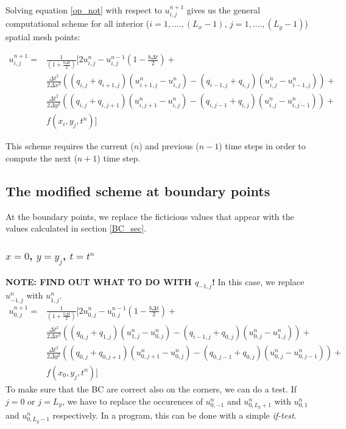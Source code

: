 \documentclass[11pt]{article} %
\newcommand{\Dx}{\Delta x}
\newcommand{\Dy}{\Delta y}
\newcommand{\Dt}{\Delta t}
\newcommand{\unp}{u^{n+1}}
\newcommand{\un}{u^{n}}
\newcommand{\unm}{u^{n-1}}
\begin{document}
Solving equation \eqref{op_not} with respect to $\unp_{i,j}$ gives us the general computational scheme for all interior ($i = 1, ....,(L_x-1)$, $j = 1,....,(L_y-1)$) spatial mesh points:

\begin{align}
\unp_{i,j} = &\frac{1}{\left(1+\frac{b\Dt}{2}\right)}\bigg[ 2\un_{i,j} - \unm_{i,j}\left(1-\frac{b\Dt}{2}\right) +\nonumber\\
&\frac{\Dt^2}{2\Dx^2}\left((q_{i,j} + q_{i+1,j})(\un_{i+1,j}-\un_{i,j}) - (q_{i-1,j} + q_{i,j})(\un_{i,j}-\un_{i-1,j})\right) + \nonumber\\
&\frac{\Dt^2}{2\Dy^2}\left((q_{i,j} + q_{i,j+1})(\un_{i,j+1}-\un_{i,j}) - (q_{i,j-1} + q_{i,j})(\un_{i,j}-\un_{i,j-1})\right) +\nonumber\\
&f(x_i, y_j, t^n)\bigg]
\end{align}


This scheme requires the current ($n$) and previous ($n-1$) time steps in order to compute the next ($n+1$) time step. 

\subsection{The modified scheme at boundary points}
At the boundary points, we replace the ficticious values that appear with the values calculated in section \ref{BC_sec}.
\subsubsection{$x=0$, $y=y_j$, $t = t^n$}
\textbf{NOTE: FIND OUT WHAT TO DO WITH $q_{-1,j}$!}
In this case, we replace $\un_{-1,j}$ with $\un_{1,j}$.
\begin{align}
\unp_{0,j} = &\frac{1}{\left(1+\frac{b\Dt}{2}\right)}\bigg[ 2\un_{0,j} - \unm_{0,j}\left(1-\frac{b\Dt}{2}\right) +\nonumber\\
&\frac{\Dt^2}{2\Dx^2}\left((q_{0,j} + q_{1,j})(\un_{1,j}-\un_{0,j}) - (q_{i-1,j} + q_{0,j})(\un_{0,j}-\un_{1,j})\right) + \nonumber\\
&\frac{\Dt^2}{2\Dy^2}\left((q_{0,j} + q_{0,j+1})(\un_{0,j+1}-\un_{0,j}) - (q_{0,j-1} + q_{0,j})(\un_{0,j}-\un_{0,j-1})\right) +\nonumber\\
&f(x_0, y_j, t^n)\bigg]
\end{align}
To make sure that the BC are correct also on the corners, we can do a test. If $j = 0$ or $j=L_y$, we have to replace the occurences of $\un_{0,-1}$ and $\un_{0,L_y+1}$ with $\un_{0,1}$ and $\un_{0,L_y-1}$ respectively. In a program, this can be done with a simple \textit{if-test}.
\end{document}
